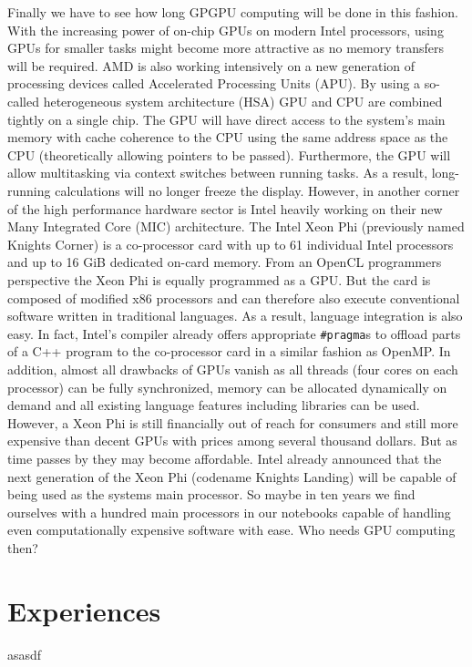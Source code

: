 Finally we have to see how long GPGPU computing will be done in this fashion. With the increasing power of on-chip GPUs on modern Intel processors, using GPUs for smaller tasks might become more attractive as no memory transfers will be required. AMD is also working intensively on a new generation of processing devices called Accelerated Processing Units (APU). By using a so-called heterogeneous system architecture (HSA) GPU and CPU are combined tightly on a single chip. The GPU will have direct access to the system's main memory with cache coherence to the CPU using the same address space as the CPU (theoretically allowing pointers to be passed). Furthermore, the GPU will allow multitasking via context switches between running tasks. As a result, long-running calculations will no longer freeze the display.
However, in another corner of the high performance hardware sector is Intel heavily working on their new Many Integrated Core (MIC) architecture. The Intel Xeon Phi (previously named Knights Corner) is a co-processor card with up to 61 individual Intel processors and up to 16 GiB dedicated on-card memory. From an OpenCL programmers perspective the Xeon Phi is equally programmed as a GPU. But the card is composed of modified x86 processors and can therefore also execute conventional software written in traditional languages. As a result, language integration is also easy. In fact, Intel's compiler already offers appropriate \lstinline!#pragma!s to offload parts of a C++ program to the co-processor card in a similar fashion as OpenMP. In addition, almost all drawbacks of GPUs vanish as all threads (four cores on each processor) can be fully synchronized, memory can be allocated dynamically on demand and all existing language features including libraries can be used. However, a Xeon Phi is still financially out of reach for consumers and still more expensive than decent GPUs with prices among several thousand dollars. But as time passes by they may become affordable. Intel already announced that the next generation of the Xeon Phi (codename Knights Landing) will be capable of being used as the systems main processor. So maybe in ten years we find ourselves with a hundred main processors in our notebooks capable of handling even computationally expensive software with ease. Who needs GPU computing then?

\section{Experiences}

asasdf